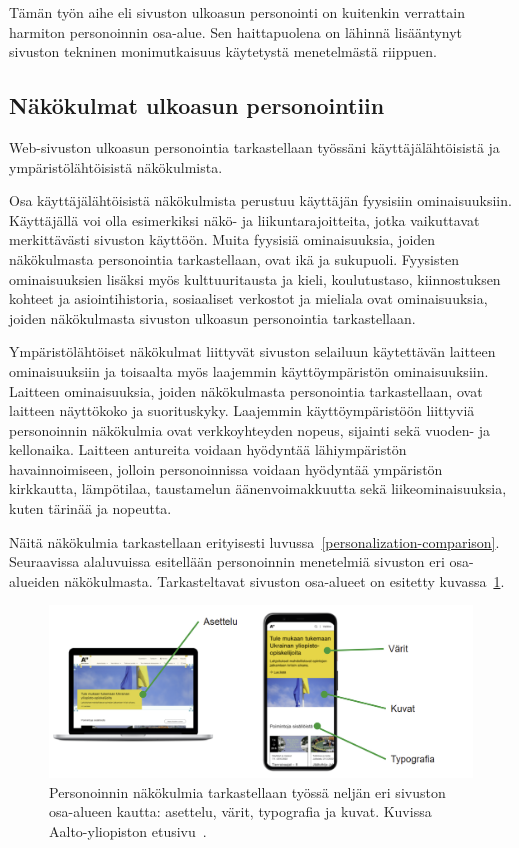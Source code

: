\documentclass[finnish, 12pt, a4paper, elec, utf8, a-1b, online]{aaltothesis}
\begin{document}
Tämän työn aihe eli sivuston ulkoasun personointi on kuitenkin verrattain
harmiton personoinnin osa-alue. Sen haittapuolena on lähinnä lisääntynyt
sivuston tekninen monimutkaisuus käytetystä menetelmästä riippuen.

\subsection{Näkökulmat ulkoasun personointiin}\label{personalization-aspects}

Web-sivuston ulkoasun personointia tarkastellaan työssäni käyttäjälähtöisistä ja
ympäristölähtöisistä näkökulmista.

Osa käyttäjälähtöisistä näkökulmista perustuu käyttäjän fyysisiin
ominaisuuksiin. Käyttäjällä voi olla esimerkiksi näkö- ja liikuntarajoitteita,
jotka vaikuttavat merkittävästi sivuston käyttöön. Muita fyysisiä ominaisuuksia,
joiden näkökulmasta personointia tarkastellaan, ovat ikä ja sukupuoli. Fyysisten
ominaisuuksien lisäksi myös kulttuuritausta ja kieli, koulutustaso,
kiinnostuksen kohteet ja asiointihistoria, sosiaaliset verkostot ja mieliala
ovat ominaisuuksia, joiden näkökulmasta sivuston ulkoasun personointia
tarkastellaan.

Ympäristölähtöiset näkökulmat liittyvät sivuston selailuun käytettävän laitteen
ominaisuuksiin ja toisaalta myös laajemmin käyttöympäristön ominaisuuksiin.
Laitteen ominaisuuksia, joiden näkökulmasta personointia tarkastellaan, ovat
laitteen näyttökoko ja suorituskyky. Laajemmin käyttöympäristöön liittyviä
personoinnin näkökulmia ovat verkkoyhteyden nopeus, sijainti sekä vuoden- ja
kellonaika. Laitteen antureita voidaan hyödyntää lähiympäristön havainnoimiseen,
jolloin personoinnissa voidaan hyödyntää ympäristön kirkkautta, lämpötilaa,
taustamelun äänenvoimakkuutta sekä liikeominaisuuksia, kuten tärinää ja
nopeutta.

Näitä näkökulmia tarkastellaan erityisesti
luvussa~\ref{personalization-comparison}. Seuraavissa alaluvuissa esitellään
personoinnin menetelmiä sivuston eri osa-alueiden näkökulmasta. Tarkasteltavat
sivuston osa-alueet on esitetty kuvassa~\ref{fig:website-areas}.

\begin{figure}[h]
    \centering
    \includegraphics[width=\textwidth]{images/website-areas.png}
    \caption{Personoinnin näkökulmia tarkastellaan työssä neljän eri sivuston
    osa-alueen kautta: asettelu, värit, typografia ja kuvat. Kuvissa
    Aalto-yliopiston etusivu~\cite{aalto-website}.~\label{fig:website-areas}}
\end{figure}
\end{document}
